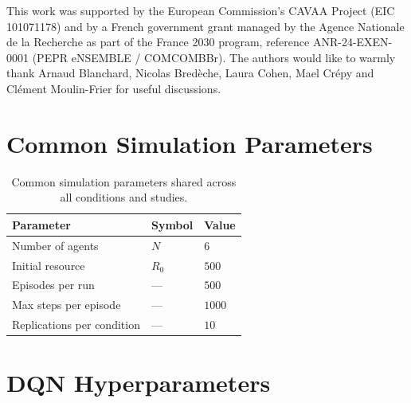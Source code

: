 \documentclass[runningheads]{llncs}
\begin{document}
This work was supported by the European Commission's CAVAA Project (EIC 101071178) and by a French government grant managed by the Agence Nationale de la Recherche as part of the France 2030 program, reference ANR-24-EXEN-0001 (PEPR eNSEMBLE / COMCOMBBr). The authors would like to warmly thank Arnaud Blanchard, Nicolas Bred\`eche, Laura Cohen, Ma\¨el Cr\'epy and Cl\'ement Moulin-Frier for useful discussions.

\newpage

%
%
%
\newpage
\appendix

\section{Common Simulation Parameters}
\label{app:simparams}

\begin{table}[h]
\centering
\begin{tabular}{lll}
\hline
\textbf{Parameter} & \textbf{Symbol} & \textbf{Value} \\
\hline
Number of agents      & $N$     & $6$    \\
Initial resource      & $R_0$   & $500$  \\
Episodes per run      & ---     & $500$  \\
Max steps per episode & ---     & $1000$ \\
Replications per condition & --- & $10$  \\
\hline
\end{tabular}
\caption{Common simulation parameters shared across all conditions and studies.}
\label{tab:simparams}
\end{table}

\section{DQN Hyperparameters}
\label{app:hyperparams}
\end{document}
